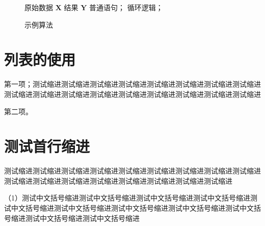 \begin{figure}
    \centering
    \begin{minipage}{0.75\linewidth}
        \begin{algorithm}[H]
            \caption{示例算法}
            \label{alg-1}
            \begin{algorithmic}[1]
                \Require 原始数据 $\mathbf{X}$
                \Ensure 结果 $\mathbf{Y}$
                \State 普通语句；
                    \State 循环逻辑；
                \EndFor
            \end{algorithmic}
        \end{algorithm}
    \end{minipage}
\end{figure}

\section{列表的使用}

\begin{asparaenum}[(1)]
    \item 第一项；测试缩进测试缩进测试缩进测试缩进测试缩进测试缩进测试缩进测试缩进测试缩进测试缩进测试缩进测试缩进测试缩进测试缩进测试缩进测试缩进测试缩进
    \item 第二项。
\end{asparaenum}

\section{测试首行缩进}

测试缩进测试缩进测试缩进测试缩进测试缩进测试缩进测试缩进测试缩进测试缩进测试缩进测试缩进测试缩进测试缩进测试缩进测试缩进测试缩进测试缩进

（1）测试中文括号缩进测试中文括号缩进测试中文括号缩进测试中文括号缩进测试中文括号缩进测试中文括号缩进测试中文括号缩进测试中文括号缩进测试中文括号缩进测试中文括号缩进测试中文括号缩进


\let\cleardoublepage\clearpage




